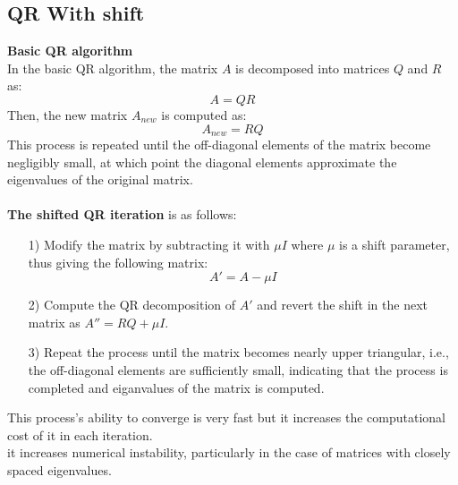 \documentclass[12pt]{article}
\begin{document}
\subsection{QR With shift}
    \textbf{Basic QR algorithm}\\
    In the basic QR algorithm, the matrix $A$ is decomposed into matrices $Q$ and $R$ as:
$$A=QR$$
Then, the new matrix $A_{new}$ is computed as:
$$A_{new}=RQ$$
This process is repeated until the off-diagonal elements of the matrix become negligibly small, at which point the diagonal elements approximate the eigenvalues of the original matrix.\\ \\
\textbf{The shifted QR iteration} is as follows:
\begin{enumerate}
    \item[1)] Modify the matrix by subtracting it with $\mu I$ where $\mu$ is a shift parameter, thus giving the following matrix:
    $$A' = A - \mu I$$
    \item[2)] Compute the QR decomposition of $A'$ and revert the shift in the next matrix as $A'' = RQ + \mu I$.
    \item[3)] Repeat the process until the matrix becomes nearly upper triangular, i.e., the off-diagonal elements are sufficiently small, indicating that the process is completed and eiganvalues of the matrix is computed.
\end{enumerate}
This process's ability to converge is very fast but it increases the computational cost of it in each iteration.\\
it increases numerical instability, particularly in the case of matrices with closely spaced eigenvalues.
\end{document}
